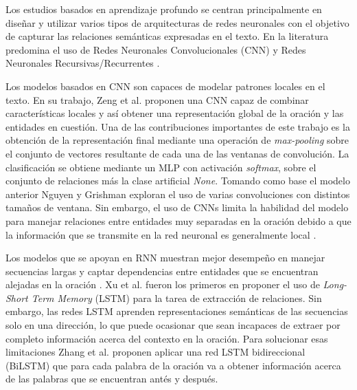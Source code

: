 Los estudios basados en aprendizaje profundo se centran principalmente en diseñar y utilizar varios tipos de arquitecturas de redes neuronales con el objetivo de capturar las relaciones semánticas expresadas en el texto. En la literatura predomina el uso de Redes Neuronales Convolucionales (CNN) \cite{zeng2014relation, santos2015classifying, nguyen2015relation} y Redes Neuronales Recursivas/Recurrentes \cite{zhang2015classificationRNN, zhang2015bidirectional, xu2015classifyingLSTMandSDP}.


Los modelos basados en CNN son capaces de modelar patrones locales en el texto. En su trabajo, Zeng et al. \cite{zeng2014relation} proponen una CNN capaz de combinar características locales y así obtener una representación global de la oración y las entidades en cuestión. Una de las contribuciones importantes de este trabajo es la obtención de la representación final mediante una operación de \textit{max-pooling} sobre el conjunto de vectores resultante de cada una de las ventanas de convolución. La clasificación se obtiene mediante un MLP con activación \textit{softmax}, sobre el conjunto de relaciones más la clase artificial \textit{None}. Tomando como base el modelo anterior  Nguyen y Grishman \cite{nguyen2015relation}  exploran el uso de varias convoluciones con distintos tamaños de ventana. Sin embargo, el uso de CNNs limita la habilidad del modelo para manejar relaciones entre entidades muy separadas en la oración debido a que la información que se transmite en la red neuronal es generalmente local \cite{zhang2020survey}.



Los modelos que se apoyan en RNN muestran mejor desempeño en manejar secuencias largas y captar dependencias entre entidades que se encuentran alejadas en la oración \cite{zhang2015classificationRNN}. Xu et al.\cite{xu2015classifyingLSTMandSDP} fueron los primeros en proponer el uso de \textit{Long-Short Term Memory} (LSTM) para la tarea de extracción de relaciones. Sin embargo, las redes LSTM aprenden representaciones semánticas de las secuencias solo en una dirección, lo que puede ocasionar que sean incapaces de extraer por completo información acerca del contexto en la oración. Para solucionar esas limitaciones Zhang et al. \cite{zhang2015bidirectional} proponen aplicar una red LSTM bidireccional (BiLSTM) que para cada palabra de la oración va a obtener información acerca de las palabras que se encuentran antés y después.   



